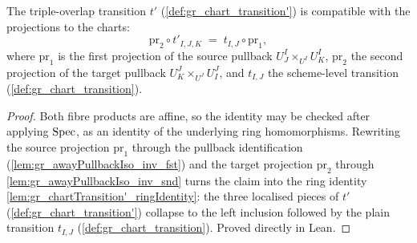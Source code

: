\begin{lemma}\leanok
  \label{lem:gr_chartTransition'_fac}
  The triple-overlap transition \(t'\) (\cref{def:gr_chart_transition'}) is
  compatible with the projections to the charts:
  \[
    \mathrm{pr}_2 \circ t'_{I,J,K} \;=\; t_{I,J} \circ \mathrm{pr}_1 ,
  \]
  where \(\mathrm{pr}_1\) is the first projection of the source pullback
  \(U^I_J \times_{U^I} U^I_K\), \(\mathrm{pr}_2\) the second projection of the
  target pullback \(U^J_K \times_{U^J} U^J_I\), and \(t_{I,J}\) the scheme-level
  transition (\cref{def:gr_chart_transition}).
\end{lemma}
\begin{proof}
  \leanok
  Both fibre products are affine, so the identity may be checked after applying
  \(\operatorname{Spec}\), as an identity of the underlying ring homomorphisms. Rewriting the
  source projection \(\mathrm{pr}_1\) through the pullback identification
  (\cref{lem:gr_awayPullbackIso_inv_fst}) and the target projection
  \(\mathrm{pr}_2\) through \cref{lem:gr_awayPullbackIso_inv_snd} turns the claim
  into the ring identity \cref{lem:gr_chartTransition'_ringIdentity}: the three
  localised pieces of \(t'\) (\cref{def:gr_chart_transition'}) collapse to the
  left inclusion followed by the plain transition \(t_{I,J}\)
  (\cref{def:gr_chart_transition}). Proved directly in Lean.
\end{proof}


